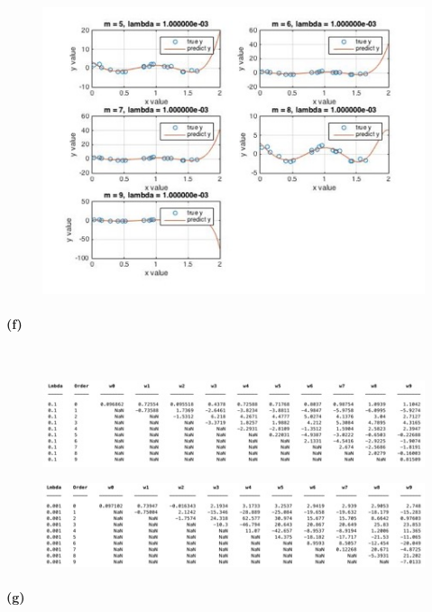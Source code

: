 \documentclass[]{article}
\begin{document}
	\begin{figure}[H]
		\centering
		\includegraphics[width=0.8\linewidth]{2e4}
		\caption{}
		\label{fig:2e4}
	\end{figure}
	
	\paragraph{(f)}\mbox{}\\
	
	\begin{figure}[H]
		\centering
		\includegraphics[width=1.2\linewidth]{2f1}
		\caption{}
		\label{fig:2f1}
	\end{figure}
	\begin{figure}[H]
		\centering
		\includegraphics[width=1.2\linewidth]{2f2}
		\caption{}
		\label{fig:2f2}
	\end{figure}
	
	\paragraph{(g)}\mbox{}\\
	
\end{document}
